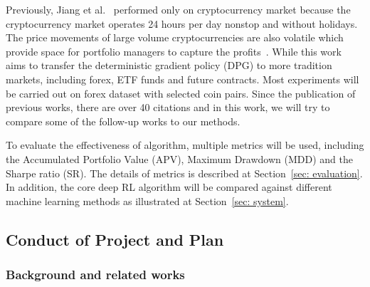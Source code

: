 Previously, Jiang et al.~\cite{jiang2017cryptocurrency} performed only on cryptocurrency market because the cryptocurrency market operates 24 hours per day nonstop and without holidays. The price movements of large volume cryptocurrencies are also volatile which provide space for portfolio managers to capture the profits~\cite{jiang2017deep}. While this work aims to transfer the deterministic gradient policy (DPG) to more tradition markets, including forex, ETF funds and future contracts. Most experiments will be carried out on forex dataset with selected coin pairs. Since the publication of previous works, there are over 40 citations and in this work, we will try to compare some of the follow-up works to our methods.

To evaluate the effectiveness of algorithm, multiple metrics will be used, including the Accumulated Portfolio Value (APV), Maximum Drawdown (MDD) and the Sharpe ratio (SR). The details of metrics is described at Section~\ref{sec: evaluation}. In addition, the core deep RL algorithm will be compared against different machine learning methods as illustrated at Section~\ref{sec: system}.

\subsection{Conduct of Project and Plan}

\subsubsection{Background and related works}
\label{subsub: background}

